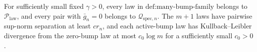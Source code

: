 For sufficiently small fixed \(\gamma>0\), every law in \(\text{def:many-bump-family}\) belongs to \(\mathcal P_{\mathrm{law}}\), and every pair with \(\bar g_n=0\) belongs to \(\mathcal Q_{\mathrm{spec},n}\). The \(m+1\) laws have pairwise sup-norm separation at least \(c r_n\), and each active-bump law has Kullback--Leibler divergence from the zero-bump law at most \(c_0\log m\) for a sufficiently small \(c_0>0\).